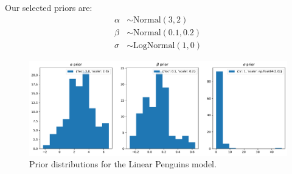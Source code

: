 Our selected priors are:\\
\begin{align*}
    \alpha &\sim \text{Normal}(3, 2)\\
    \beta &\sim \text{Normal}(0.1, 0.2)\\
    \sigma &\sim \text{LogNormal}(1, 0)
\end{align*}

\begin{figure}
    \centering
    \includegraphics[width=\linewidth]{data/05_reporting/problem_set_2/prior_distributions.pdf}
    \caption{Prior distributions for the Linear Penguins model.}
    \label{fig:penguin-priors}
\end{figure}